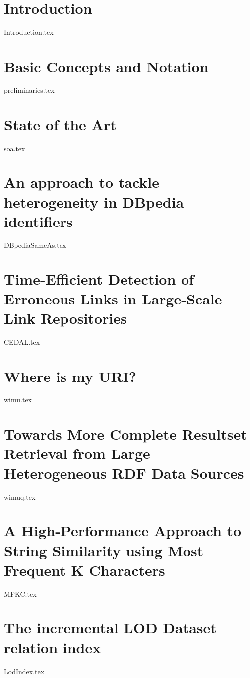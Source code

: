 \documentclass[a4paper,twoside,abstracton,12pt,BCOR=15mm]{scrreprt}
\begin{document}
\chapter{Introduction}

\renewcommand{\thepage}{\arabic{page}}
\setcounter{page}{1}

{Introduction.tex}

\chapter{Basic Concepts and Notation} \label{ch:preliminaries}
{preliminaries.tex}

\chapter{State of the Art} \label{ch:soa}
{soa.tex}

\chapter{An approach to tackle heterogeneity in DBpedia identifiers} \label{ch:dbpediaSameAs}
{DBpediaSameAs.tex}

\chapter{Time-Efficient Detection of Erroneous Links in Large-Scale Link Repositories} \label{ch:CEDAL}
{CEDAL.tex}

\chapter{Where is my URI?} \label{ch:wimu}
{wimu.tex}

\chapter{Towards More Complete Resultset Retrieval from Large Heterogeneous RDF Data Sources} \label{ch:wimuq}
{wimuq.tex}

\chapter{A High-Performance Approach to String Similarity using Most Frequent K Characters} \label{ch:MFKC}
{MFKC.tex}

\chapter{The incremental LOD Dataset relation index} \label{ch:lodIndex}
{LodIndex.tex}
\end{document}
